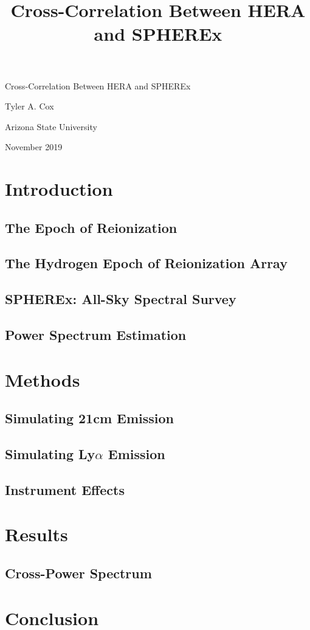 \documentclass[12pt]{article}
\title{Cross-Correlation Between HERA and SPHEREx}
\begin{document}
\vspace*{0.25\textheight}
\begin{center}
{\Large Cross-Correlation Between HERA and SPHEREx}
\end{center}
\begin{center}
Tyler A. Cox \par
Arizona State University \par
November 2019 \par
\end{center}

\newpage

\begin{abstract}

\end{abstract}

\newpage

\tableofcontents

\newpage

\section{Introduction}
\subsection{The Epoch of Reionization}
\lipsum[2-4]
\subsection{The Hydrogen Epoch of Reionization Array}
\lipsum[2-4]
\subsection{SPHEREx: All-Sky Spectral Survey}
\lipsum[2-4]
\subsection{Power Spectrum Estimation}



\section{Methods}
\subsection{Simulating 21cm Emission}
\lipsum[2-4]
\subsection{Simulating Ly$\alpha$ Emission}
\lipsum[2-4]
\subsection{Instrument Effects}
\lipsum[2-4]

\section{Results}
\subsection{Cross-Power Spectrum}
\lipsum[2-4]

\section{Conclusion}
\end{document}
